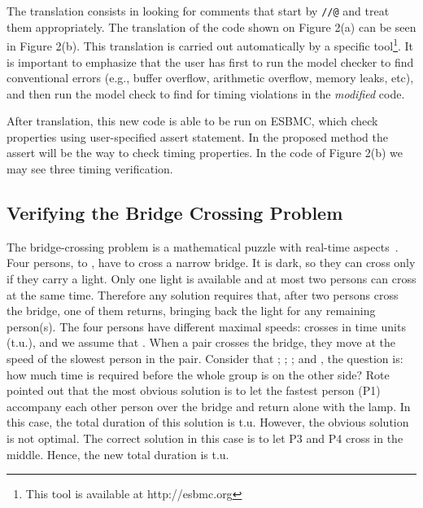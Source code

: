 \documentclass{llncs}
\begin{document}
The translation consists in looking for comments that start by {\tt //@} and treat them appropriately. 
The translation of the code shown on Figure 2(a)  
can be seen in Figure 2(b).
This translation is carried out automatically by a specific tool\footnote{This tool is available at http://esbmc.org}. 
It is important to emphasize that the user has first to run the model checker to find conventional errors 
(e.g., buffer overflow, arithmetic overflow, memory leaks, etc), 
and then run the model check to find for timing violations in the {\it modified} code.

After translation, this new code is able to be run on ESBMC, which 
check properties using user-specified assert statement.
In the proposed method the assert will be the way to check timing properties.
In the code of Figure 2(b) we may see three timing verification.


\subsection{Verifying the Bridge Crossing Problem}
\label{section:toy_example}

The bridge-crossing problem is a mathematical puzzle with real-time aspects~\cite{Rote02}. 
Four persons,  to , have to cross a narrow bridge.
It is dark, so they can cross only if they carry a light. 
Only one light is available and at most two persons can cross at the same time. 
Therefore any solution requires that, after two persons cross the bridge, 
one of them returns, bringing back the light for any remaining person(s). 
The four persons have different maximal speeds: 
 crosses in  time units (t.u.), 
and we assume that .
When a pair crosses the bridge, they move at the speed of the slowest person in the pair. 
Consider that ; ; ; and , 
the question is: how much time is required before the whole group is on the other side?
Rote~\cite{Rote02} pointed out that the most obvious solution is to let the 
fastest person (P1) accompany each other
person over the bridge and return alone with the lamp. 
In this case, the total duration of this solution is
 t.u.
However, the obvious solution is not optimal. 
The correct solution in this case is to let P3 and P4 cross in the middle.
Hence, the new total duration is
 t.u.
\end{document}
